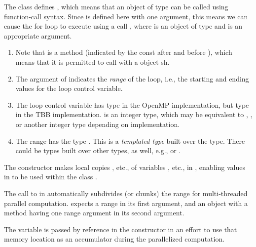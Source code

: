 \documentclass[letterpaper,10pt,openany,oneside]{sphinxmanual}
\begin{document}
The class  defines , which means that an object of type  can be called using function-call syntax. Since  is defined here with one argument, this means we can cause the for loop to execute using a call , where  is an object of type  and  is an appropriate argument.
\begin{enumerate}
\item {} 
Note that  is a  method (indicated by the const after \code{)} and before \code{\{} ), which means that it is permitted to call  with a  object sh.

\item {} 
The argument  of  indicates the \emph{range} of the loop, i.e., the starting and ending values for the loop control variable.

\item {} 
The loop control variable  has type  in the OpenMP implementation, but type  in the TBB implementation.  is an integer type, which may be equivalent to , , or another integer type depending on implementation.

\item {} 
The range  has the type . This is a \emph{templated type} built over the  type. There could be  types built over other types, as well, e.g.,  or .

\end{enumerate}

The constructor  makes local copies , etc., of variables , etc., in , enabling values in  to be used within the class .

The call to  in  automatically subdivides (or chunks) the range  for multi-threaded parallel computation.  expects a range in its first argument, and an object with a method  having one range argument in its second argument.

The variable  is passed by reference in the constructor  in an effort to use that memory location  as an accumulator during the parallelized computation.
\end{document}
